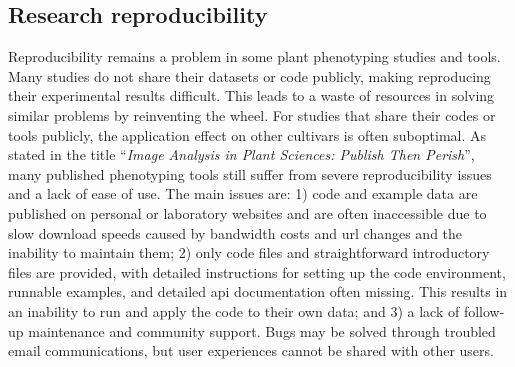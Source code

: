 \subsection{Research reproducibility}
Reproducibility remains a problem in some plant phenotyping studies and tools. Many studies do not share their datasets or code publicly, making reproducing their experimental results difficult. This leads to a waste of resources in solving similar problems by reinventing the wheel. For studies that share their codes or tools publicly, the application effect on other cultivars is often suboptimal. As \citet{lobet_image_2017} stated in the title ``\textit{Image Analysis in Plant Sciences: Publish Then Perish}'', many published phenotyping tools still suffer from severe reproducibility issues and a lack of ease of use. The main issues are: 1) code and example data are published on personal or laboratory websites and are often inaccessible due to slow download speeds caused by bandwidth costs and \gls{url} changes and the inability to maintain them; 2) only code files and straightforward introductory files are provided, with detailed instructions for setting up the code environment, runnable examples, and detailed \gls{api} documentation often missing. This results in an inability to run and apply the code to their own data; and 3) a lack of follow-up maintenance and community support. Bugs may be solved through troubled email communications, but user experiences cannot be shared with other users.



